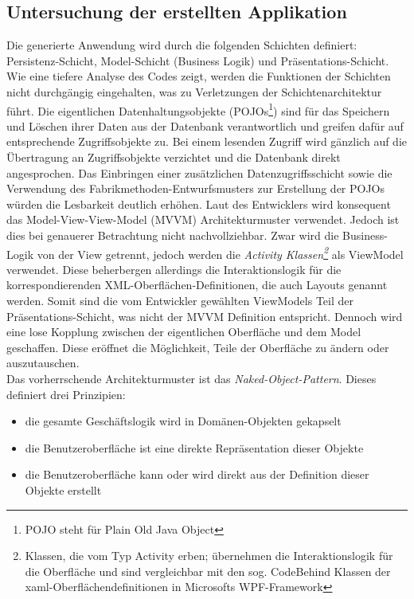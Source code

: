 \documentclass[a4paper,twoside]{article}
\begin{document}
\subsection{Untersuchung der erstellten Applikation}
\label{ssec:untApp}
Die generierte Anwendung wird durch die folgenden Schichten definiert: Persistenz-Schicht, Model-Schicht (Business Logik) und Präsentations-Schicht. Wie eine tiefere Analyse des Codes zeigt, werden die Funktionen der Schichten nicht durchgängig eingehalten, was zu Verletzungen der Schichtenarchitektur führt. Die eigentlichen Datenhaltungsobjekte (POJOs\footnote{POJO steht für Plain Old Java Object}) sind für das Speichern und Löschen ihrer Daten aus der Datenbank verantwortlich und greifen dafür auf entsprechende Zugriffsobjekte zu. Bei einem lesenden Zugriff wird gänzlich auf die Übertragung an Zugriffsobjekte verzichtet und die Datenbank direkt angesprochen. Das Einbringen einer zusätzlichen Datenzugriffsschicht sowie die Verwendung des Fabrikmethoden-Entwurfsmusters zur Erstellung der POJOs würden die Lesbarkeit deutlich erhöhen. 
Laut des Entwicklers wird konsequent das Model-View-View-Model (MVVM) Architekturmuster verwendet. Jedoch ist dies bei genauerer Betrachtung nicht nachvollziehbar. Zwar wird die Business-Logik von der View getrennt, jedoch werden die \textit{Activity Klassen\footnote{Klassen, die vom Typ Activity erben; übernehmen die Interaktionslogik für die Oberfläche und sind vergleichbar mit den sog. CodeBehind Klassen der xaml-Oberflächendefinitionen in Microsofts WPF-Framework }} als ViewModel verwendet. Diese beherbergen allerdings die Interaktionslogik für die korrespondierenden XML-Oberflächen-Definitionen, die auch Layouts genannt werden. Somit sind die vom Entwickler gewählten ViewModels Teil der Präsentations-Schicht, was nicht der MVVM Definition entspricht.
Dennoch wird eine lose Kopplung zwischen der eigentlichen Oberfläche und dem Model geschaffen. Diese eröffnet die Möglichkeit, Teile der Oberfläche zu ändern oder auszutauschen.
\\

Das vorherrschende Architekturmuster ist das \textit{Naked-Object-Pattern}. Dieses definiert drei Prinzipien: \begin{itemize}
\item die gesamte Geschäftslogik wird in Domänen-Objekten gekapselt
\item die Benutzeroberfläche ist eine direkte Repräsentation dieser Objekte 
\item die Benutzeroberfläche kann oder wird direkt aus der Definition dieser Objekte erstellt
\end{itemize}
\end{document}
